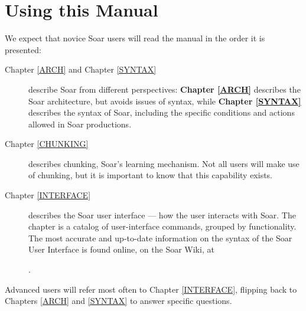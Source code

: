 \section{Using this Manual}


We expect that novice Soar users will read the manual in the order it is
presented: 

\begin{description}
\item[Chapter \ref{ARCH} and Chapter \ref{SYNTAX}] describe Soar from
different perspectives: \textbf{Chapter \ref{ARCH}} describes the Soar
architecture, but avoids issues of syntax, while \textbf{Chapter \ref{SYNTAX}}
describes the syntax of Soar, including the specific conditions and actions
allowed in Soar productions.

\item[Chapter \ref{CHUNKING}] describes chunking, Soar's learning
mechanism.  Not all users will make use of chunking, but it is important to
know that this capability exists.

\item[Chapter \ref{INTERFACE}] describes the Soar user interface --- how the
user interacts with Soar. The chapter is a catalog of user-interface commands,
grouped by functionality.  The most accurate and up-to-date information on the syntax of the Soar User Interface is found online, on the Soar Wiki, at

\hspace{2em}.

\end{description}

Advanced users will refer most often to Chapter \ref{INTERFACE}, flipping back
to Chapters \ref{ARCH} and \ref{SYNTAX} to answer specific questions.

